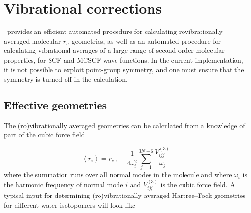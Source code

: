 \chapter{Vibrational corrections}\label{ch:vibave}

\siraba\ provides an efficient automated procedure for calculating
rovibrationally averaged molecular $r_\alpha$ geometries, as well as an
automated procedure for calculating vibrational averages of a large
range of second-order molecular properties, for SCF and MCSCF wave
functions. In the current implementation, it is not possible to
exploit point-group symmetry, and one must ensure that the symmetry is
turned off in the calculation.

\begin{center}
\end{center}

\section{Effective geometries}\label{sec:effgeom}

The (ro)vibrationally averaged geometries can be
calculated from a knowledge of part of the cubic force field

\begin{equation}
\left<r_i\right> = r_{e,i} -
\frac{1}{4\omega_i^2}\sum_{j=1}^{3N-6}\frac{V^{\left(3\right)}_{ijj}}{\omega_j}
\end{equation}
where the summation runs over all normal modes in the molecule and
where $\omega_i$ is the harmonic frequency of normal mode $i$ and
$V^{\left(3\right)}_{ijj}$ is the cubic force field. A typical input
for determining (ro)vibrationally averaged Hartree--Fock geometries
for different water isotopomers will look like

